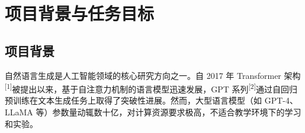 \documentclass[a4paper, 12pt, centering, AutoFakeBold]{article}
\begin{document}
\restoregeometry
\newpage
\begin{abstract}
\noindent
本文从零实现了一个小型 GPT 风格的自回归语言模型（Mini-GPT），并在中文古诗词数据集上完成了从零训练和分类条件微调两阶段实验。模型采用 Pre-LN Transformer 架构，包含多头自注意力、可学习位置编码、因果掩码和 Weight Tying 等现代语言模型的核心组件，所有注意力模块均从底层实现（不依赖 \texttt{nn.MultiheadAttention}）。在数据层面，本文设计了两套独立的清洗管线——针对原始数据源的通用清洗（去括号注释、保留汉字句读）和面向体裁分类的标签重构（短语字数分析+标题特征检测），后者从约 36.7 万首诗词中自动识别出五言绝句、七言律诗、词、曲等九类体裁。在微调阶段，通过拼接 \texttt{<BOS><分类标签>诗词正文<EOS>} 的序列格式，使模型学会条件概率 $P(\text{正文}\mid\langle\text{分类标签}\rangle)$，实现了推理时输入体裁标签即可控制生成风格的条件生成能力。实验结果表明，模型能够根据输入的分类标签生成符合对应体裁格式的诗词文本。本文还实现了四种采样策略（Greedy、Temperature、Top-K、Top-P）并进行了系统对比分析。所有代码均可在普通笔记本电脑上运行。代码与模型在GitHub托管：\url{https://github.com/Douglassgs/AIbasic.git}。

\vspace{1em}
\noindent\textbf{关键字：}Transformer；GPT；自回归语言模型；古诗词生成；条件生成；注意力机制；分词器
\end{abstract}

\newpage
\tableofcontents
\thispagestyle{empty}

\newpage
\setcounter{page}{1}

\section{项目背景与任务目标}

\subsection{项目背景}

自然语言生成是人工智能领域的核心研究方向之一。自 2017 年 Transformer 架构\textsuperscript{[1]}被提出以来，基于自注意力机制的语言模型迅速发展，GPT 系列\textsuperscript{[2]}通过自回归预训练在文本生成任务上取得了突破性进展。然而，大型语言模型（如 GPT-4、LLaMA 等）参数量动辄数十亿，对计算资源要求极高，不适合教学环境下的学习和实验。
\end{document}
